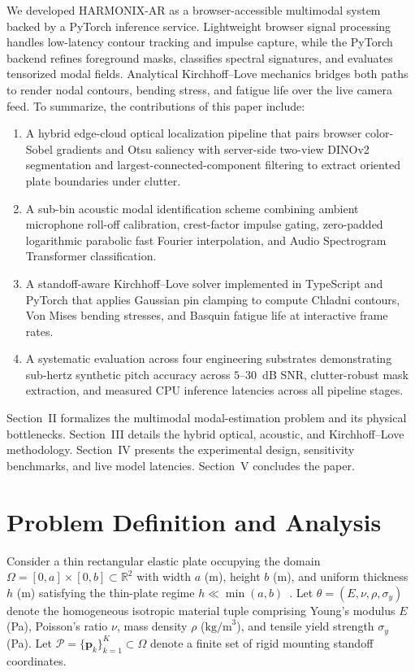 \documentclass[journal]{IEEEtran}
\begin{document}
We developed HARMONIX-AR as a browser-accessible multimodal system backed by a PyTorch inference service. Lightweight browser signal processing handles low-latency contour tracking and impulse capture, while the PyTorch backend refines foreground masks, classifies spectral signatures, and evaluates tensorized modal fields. Analytical Kirchhoff--Love mechanics bridges both paths to render nodal contours, bending stress, and fatigue life over the live camera feed. To summarize, the contributions of this paper include:
\begin{enumerate}
\item A hybrid edge-cloud optical localization pipeline that pairs browser color-Sobel gradients and Otsu saliency with server-side two-view DINOv2 segmentation and largest-connected-component filtering to extract oriented plate boundaries under clutter.
\item A sub-bin acoustic modal identification scheme combining ambient microphone roll-off calibration, crest-factor impulse gating, zero-padded logarithmic parabolic fast Fourier interpolation, and Audio Spectrogram Transformer classification.
\item A standoff-aware Kirchhoff--Love solver implemented in TypeScript and PyTorch that applies Gaussian pin clamping to compute Chladni contours, Von Mises bending stresses, and Basquin fatigue life at interactive frame rates.
\item A systematic evaluation across four engineering substrates demonstrating sub-hertz synthetic pitch accuracy across $5\text{--}30$~dB SNR, clutter-robust mask extraction, and measured CPU inference latencies across all pipeline stages.
\end{enumerate}

Section~II formalizes the multimodal modal-estimation problem and its physical bottlenecks. Section~III details the hybrid optical, acoustic, and Kirchhoff--Love methodology. Section~IV presents the experimental design, sensitivity benchmarks, and live model latencies. Section~V concludes the paper.

\section{Problem Definition and Analysis}
Consider a thin rectangular elastic plate occupying the domain $\Omega = [0, a] \times [0, b] \subset \mathbb{R}^2$ with width $a$ (m), height $b$ (m), and uniform thickness $h$ (m) satisfying the thin-plate regime $h \ll \min(a, b)$~\cite{timoshenko1959theory}. Let $\theta = (E, \nu, \rho, \sigma_y)$ denote the homogeneous isotropic material tuple comprising Young's modulus $E$ (Pa), Poisson's ratio $\nu$, mass density $\rho$ ($\text{kg/m}^3$), and tensile yield strength $\sigma_y$ (Pa). Let $\mathcal{P} = \{\mathbf{p}_k\}_{k=1}^{K} \subset \Omega$ denote a finite set of rigid mounting standoff coordinates.
\end{document}
